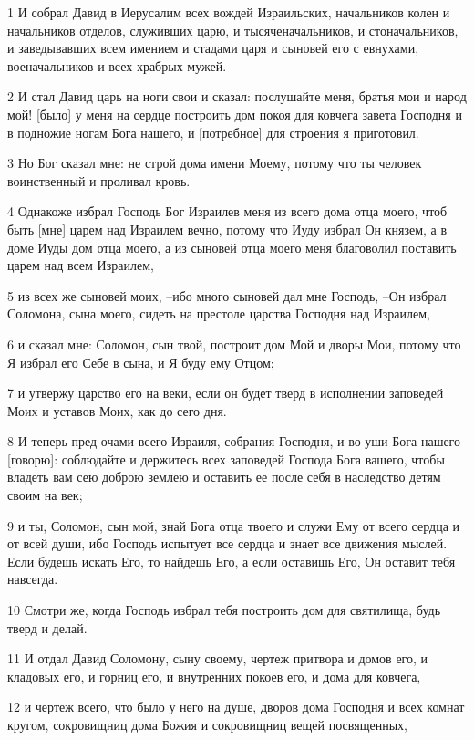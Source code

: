 \par 1 И собрал Давид в Иерусалим всех вождей Израильских, начальников колен и начальников отделов, служивших царю, и тысяченачальников, и стоначальников, и заведывавших всем имением и стадами царя и сыновей его с евнухами, военачальников и всех храбрых мужей.
\par 2 И стал Давид царь на ноги свои и сказал: послушайте меня, братья мои и народ мой! [было] у меня на сердце построить дом покоя для ковчега завета Господня и в подножие ногам Бога нашего, и [потребное] для строения я приготовил.
\par 3 Но Бог сказал мне: не строй дома имени Моему, потому что ты человек воинственный и проливал кровь.
\par 4 Однакоже избрал Господь Бог Израилев меня из всего дома отца моего, чтоб быть [мне] царем над Израилем вечно, потому что Иуду избрал Он князем, а в доме Иуды дом отца моего, а из сыновей отца моего меня благоволил поставить царем над всем Израилем,
\par 5 из всех же сыновей моих, --ибо много сыновей дал мне Господь, --Он избрал Соломона, сына моего, сидеть на престоле царства Господня над Израилем,
\par 6 и сказал мне: Соломон, сын твой, построит дом Мой и дворы Мои, потому что Я избрал его Себе в сына, и Я буду ему Отцом;
\par 7 и утвержу царство его на веки, если он будет тверд в исполнении заповедей Моих и уставов Моих, как до сего дня.
\par 8 И теперь пред очами всего Израиля, собрания Господня, и во уши Бога нашего [говорю]: соблюдайте и держитесь всех заповедей Господа Бога вашего, чтобы владеть вам сею доброю землею и оставить ее после себя в наследство детям своим на век;
\par 9 и ты, Соломон, сын мой, знай Бога отца твоего и служи Ему от всего сердца и от всей души, ибо Господь испытует все сердца и знает все движения мыслей. Если будешь искать Его, то найдешь Его, а если оставишь Его, Он оставит тебя навсегда.
\par 10 Смотри же, когда Господь избрал тебя построить дом для святилища, будь тверд и делай.
\par 11 И отдал Давид Соломону, сыну своему, чертеж притвора и домов его, и кладовых его, и горниц его, и внутренних покоев его, и дома для ковчега,
\par 12 и чертеж всего, что было у него на душе, дворов дома Господня и всех комнат кругом, сокровищниц дома Божия и сокровищниц вещей посвященных,
